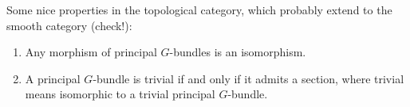 Some nice properties in the topological category, which probably extend to the smooth category (check!):

\begin{prop}
    \begin{enumerate}[label=\roman*)]
	\item Any morphism of principal $G$-bundles is an isomorphism.
	\item A principal $G$-bundle is trivial if and only if it admits a section, where trivial means isomorphic to a trivial principal $G$-bundle.
    \end{enumerate}
\end{prop}
